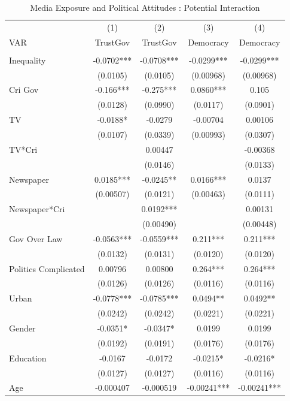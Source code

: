 \documentclass[12pt]{article}\usepackage[]{graphicx}\usepackage[]{color}
\begin{document}
\begin{table}[htbp]
	\centering
	\caption{\label{media} Media Exposure and Political Attitudes : Potential Interaction}
	\begin{tabular}{lcccc}
		\hline
		& (1)   & (2)   & (3)   & (4) \\
		VAR   & TrustGov & TrustGov & Democracy & Democracy \\
		&       &       &       &  \\
		\hline
		Inequality & -0.0702*** & -0.0708*** & -0.0299*** & -0.0299*** \\
		& (0.0105) & (0.0105) & (0.00968) & (0.00968) \\
		Cri Gov & -0.166*** & -0.275*** & 0.0860*** & 0.105 \\
		& (0.0128) & (0.0990) & (0.0117) & (0.0901) \\
		TV    & -0.0188* & -0.0279 & -0.00704 & 0.00106 \\
		& (0.0107) & (0.0339) & (0.00993) & (0.0307) \\
		TV*Cri &       & 0.00447 &       & -0.00368 \\
		&       & (0.0146) &       & (0.0133) \\
		Newspaper & 0.0185*** & -0.0245** & 0.0166*** & 0.0137 \\
		& (0.00507) & (0.0121) & (0.00463) & (0.0111) \\
		Newspaper*Cri &       & 0.0192*** &       & 0.00131 \\
		&       & (0.00490) &       & (0.00448) \\
		Gov Over Law & -0.0563*** & -0.0559*** & 0.211*** & 0.211*** \\
		& (0.0132) & (0.0131) & (0.0120) & (0.0120) \\
		Politics Complicated & 0.00796 & 0.00800 & 0.264*** & 0.264*** \\
		& (0.0126) & (0.0126) & (0.0116) & (0.0116) \\
		Urban & -0.0778*** & -0.0785*** & 0.0494** & 0.0492** \\
		& (0.0242) & (0.0242) & (0.0221) & (0.0221) \\
		Gender & -0.0351* & -0.0347* & 0.0199 & 0.0199 \\
		& (0.0192) & (0.0191) & (0.0176) & (0.0176) \\
		Education & -0.0167 & -0.0172 & -0.0215* & -0.0216* \\
		& (0.0127) & (0.0127) & (0.0116) & (0.0116) \\
		Age   & -0.000407 & -0.000519 & -0.00241*** & -0.00241*** \\

\end{tabular}
\end{table}
\end{document}
